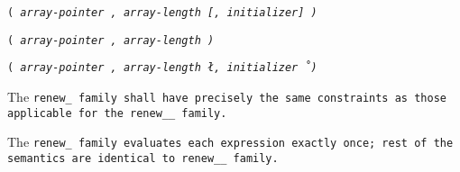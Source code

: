 
\s\s\s\tt{(} \it{array-pointer} \tt{,} \it{array-length}
[\tt{,} \it{initializer}] \tt{)}

\s\tt{(} \it{array-pointer} \tt{,} \it{array-length} \tt{)}

\s\tt{(} \it{array-pointer} \tt{,} \it{array-length}
\l\tt{,} \it{initializer}\r\ \tt{)}


The \tt{renew_} family shall have precisely the same
constraints as those applicable for the \tt{renew__} family.


The \tt{renew_} family evaluates each expression exactly once;
rest of the semantics are identical to  \tt{renew__} family.
